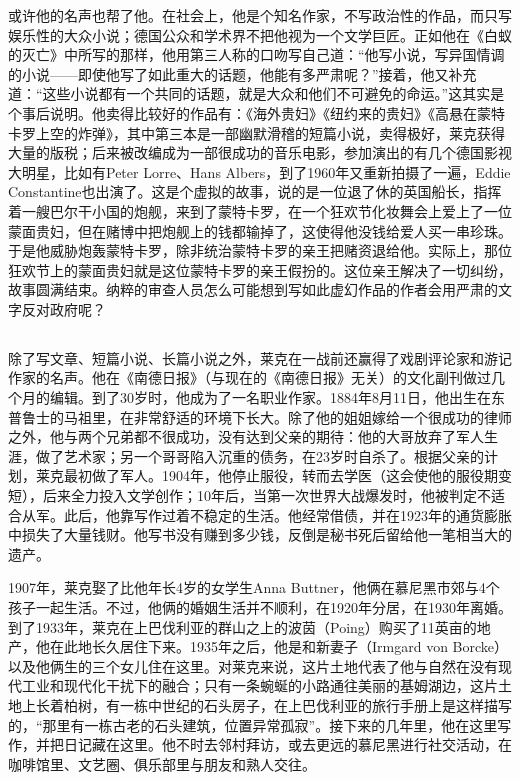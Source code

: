 \documentclass[UTF8]{ctexart}
\begin{document}
或许他的名声也帮了他。在社会上，他是个知名作家，不写政治性的作品，而只写娱乐性的大众小说；德国公众和学术界不把他视为一个文学巨匠。正如他在《白蚁的灭亡》中所写的那样，他用第三人称的口吻写自己道：“他写小说，写异国情调的小说——即使他写了如此重大的话题，他能有多严肃呢？”接着，他又补充道：“这些小说都有一个共同的话题，就是大众和他们不可避免的命运。”这其实是个事后说明。他卖得比较好的作品有：《海外贵妇》《纽约来的贵妇》《高悬在蒙特卡罗上空的炸弹》，其中第三本是一部幽默滑稽的短篇小说，卖得极好，莱克获得大量的版税；后来被改编成为一部很成功的音乐电影，参加演出的有几个德国影视大明星，比如有Peter Lorre、Hans Albers，到了1960年又重新拍摄了一遍，Eddie Constantine也出演了。这是个虚拟的故事，说的是一位退了休的英国船长，指挥着一艘巴尔干小国的炮舰，来到了蒙特卡罗，在一个狂欢节化妆舞会上爱上了一位蒙面贵妇，但在赌博中把炮舰上的钱都输掉了，这使得他没钱给爱人买一串珍珠。于是他威胁炮轰蒙特卡罗，除非统治蒙特卡罗的亲王把赌资退给他。实际上，那位狂欢节上的蒙面贵妇就是这位蒙特卡罗的亲王假扮的。这位亲王解决了一切纠纷，故事圆满结束。纳粹的审查人员怎么可能想到写如此虚幻作品的作者会用严肃的文字反对政府呢？

\subsection{}

除了写文章、短篇小说、长篇小说之外，莱克在一战前还赢得了戏剧评论家和游记作家的名声。他在《南德日报》（与现在的《南德日报》无关）的文化副刊做过几个月的编辑。到了30岁时，他成为了一名职业作家。1884年8月11日，他出生在东普鲁士的马祖里，在非常舒适的环境下长大。除了他的姐姐嫁给一个很成功的律师之外，他与两个兄弟都不很成功，没有达到父亲的期待：他的大哥放弃了军人生涯，做了艺术家；另一个哥哥陷入沉重的债务，在23岁时自杀了。根据父亲的计划，莱克最初做了军人。1904年，他停止服役，转而去学医（这会使他的服役期变短），后来全力投入文学创作；10年后，当第一次世界大战爆发时，他被判定不适合从军。此后，他靠写作过着不稳定的生活。他经常借债，并在1923年的通货膨胀中损失了大量钱财。他写书没有赚到多少钱，反倒是秘书死后留给他一笔相当大的遗产。

1907年，莱克娶了比他年长4岁的女学生Anna Buttner，他俩在慕尼黑市郊与4个孩子一起生活。不过，他俩的婚姻生活并不顺利，在1920年分居，在1930年离婚。到了1933年，莱克在上巴伐利亚的群山之上的波茵（Poing）购买了11英亩的地产，他在此地长久居住下来。1935年之后，他是和新妻子（Irmgard von Borcke）以及他俩生的三个女儿住在这里。对莱克来说，这片土地代表了他与自然在没有现代工业和现代化干扰下的融合；只有一条蜿蜒的小路通往美丽的基姆湖边，这片土地上长着柏树，有一栋中世纪的石头房子，在上巴伐利亚的旅行手册上是这样描写的，“那里有一栋古老的石头建筑，位置异常孤寂”。接下来的几年里，他在这里写作，并把日记藏在这里。他不时去邻村拜访，或去更远的慕尼黑进行社交活动，在咖啡馆里、文艺圈、俱乐部里与朋友和熟人交往。
\end{document}
